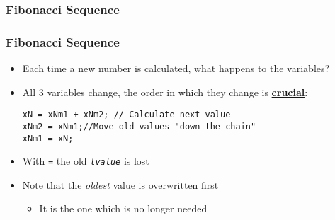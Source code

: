 \documentclass[14pt]{beamer}
\begin{document}
\begin{frame}[fragile]
\frametitle{Fibonacci Sequence}
\end{frame}

\begin{frame}[fragile]
\frametitle{Fibonacci Sequence}
\begin{itemize}
\item Each time a new number is calculated, what happens to the variables?
\item All 3 variables change, the order in which they change is \underline{\textbf{crucial}}:
	\begin{lstlisting}[style=CStyle]
xN = xNm1 + xNm2; // Calculate next value
xNm2 = xNm1;//Move old values "down the chain"
xNm1 = xN;
\end{lstlisting}
\item With \texttt{=} the old \texttt{\textit{lvalue}} is lost
\item Note that the \textit{oldest} value is overwritten first
	\begin{itemize}
		\item It is the one which is no longer needed
	\end{itemize}
\end{itemize}
\end{frame}
\end{document}
